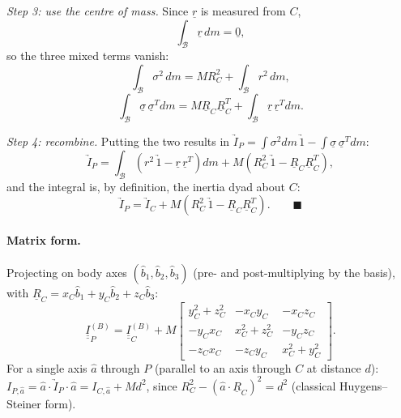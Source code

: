 \emph{Step 3: use the centre of mass.} Since $\underline r$ is measured from $C$,
\begin{equation}
\int_{\mathcal B}\underline r\,dm=\underline 0,
\end{equation}
so the three mixed terms vanish:
\begin{equation}
\int_{\mathcal B}\sigma^2\,dm=MR_C^2+\int_{\mathcal B}r^2\,dm,
\end{equation}
\begin{equation}
\int_{\mathcal B}\underline\sigma\,\underline\sigma^T dm=M\underline R_C\underline R_C^T+\int_{\mathcal B}\underline r\,\underline r^T dm .
\end{equation}

\emph{Step 4: recombine.} Putting the two results in $\underrightarrow I_P=\int\sigma^2dm\,\underrightarrow1-\int\underline\sigma\,\underline\sigma^Tdm$:
\begin{equation}
\underrightarrow{I}_{P}=\int_{\mathcal{B}}\left(r^{2}\,\underrightarrow{1}-\underline{r}\,\underline{r}^T\right)dm
+M\left(R_{C}^{2}\,\underrightarrow{1}-\underline{R}_{C}\underline{R}_{C}^T\right),
\end{equation}
and the integral is, by definition, the inertia dyad about $C$:
\begin{equation}
\underrightarrow{I}_{P}=\underrightarrow{I}_{C}+M\left(R_{C}^{2}\,\underrightarrow{1}-\underline{R}_{C}\underline{R}_{C}^T\right).\qquad\blacksquare
\end{equation}

\paragraph{Matrix form.} Projecting on body axes $(\hat b_1,\hat b_2,\hat b_3)$ (pre- and post-multiplying by the basis), with
$\underline R_C=x_C\hat b_1+y_C\hat b_2+z_C\hat b_3$:
\begin{equation}
\underline{\underline{I}}_P^{(B)}=\underline{\underline{I}}_{C}^{(B)}+M\begin{bmatrix}y_{C}^{2}+z_{C}^{2}&-x_{C}y_{C}&-x_{C}z_{C}\\-y_{C}x_{C}&x_{C}^{2}+z_{C}^{2}&-y_{C}z_{C}\\-z_{C}x_{C}&-z_{C}y_{C}&x_{C}^{2}+y_{C}^{2}\end{bmatrix}.
\end{equation}
For a single axis $\hat a$ through $P$ (parallel to an axis through $C$ at distance $d$): $I_{P,\hat a}=\hat a\cdot\underrightarrow I_P\cdot\hat a=I_{C,\hat a}+Md^2$,
since $R_C^2-(\hat a\cdot\underline R_C)^2=d^2$ (classical Huygens--Steiner form).

